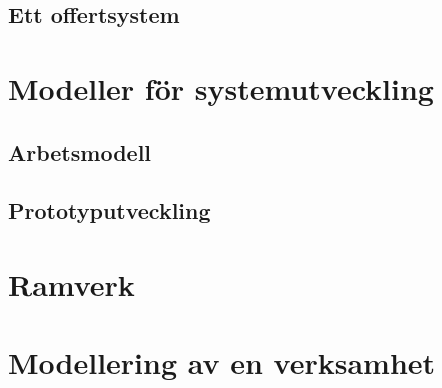 \subsection{Ett offertsystem}

\section{Modeller för systemutveckling}

\subsection{Arbetsmodell}

\subsection{Prototyputveckling}




\section{Ramverk}

\section{Modellering av en verksamhet}
